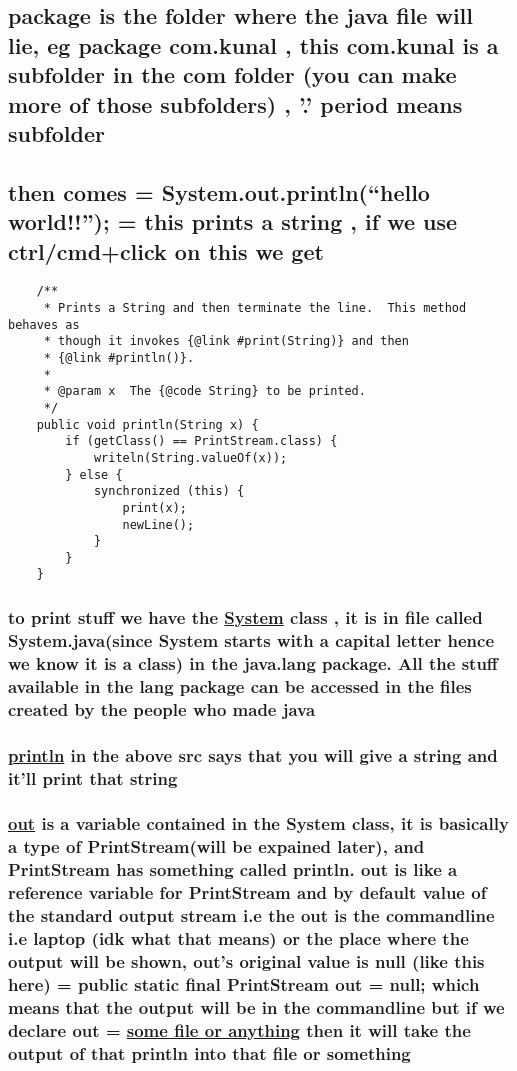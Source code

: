 \documentclass[11pt]{article}
\begin{document}
\subsection{package is the folder where the java file will lie, eg package com.kunal , this com.kunal is a subfolder in the com folder (you can make more of those subfolders) , '.' period means subfolder}
\label{sec:org9e4d127}
\subsection{then comes = System.out.println(``hello world!!''); = this prints a string , if we use ctrl/cmd+click on this we get}
\label{sec:orgc21ebb7}

\begin{verbatim}
    /**
     * Prints a String and then terminate the line.  This method behaves as
     * though it invokes {@link #print(String)} and then
     * {@link #println()}.
     *
     * @param x  The {@code String} to be printed.
     */
    public void println(String x) {
        if (getClass() == PrintStream.class) {
            writeln(String.valueOf(x));
        } else {
            synchronized (this) {
                print(x);
                newLine();
            }
        }
    }
\end{verbatim}

\subsubsection{to print stuff we have the \underline{System} class , it is in file called System.java(since System starts with a capital letter hence we know it is a class) in the java.lang package. All the stuff available in the lang package can be accessed in the files created by the people who made java}
\label{sec:org695fc21}
\subsubsection{\underline{println} in the above src says that you will give a string and it'll print that string}
\label{sec:orgdec896d}
\subsubsection{\underline{out} is a variable contained in the System class, it is basically a type of PrintStream(will be expained later), and PrintStream has something called println. out is like a reference variable for PrintStream and by default value of the standard output stream i.e the out is the commandline i.e laptop (idk what that means) or the place where the output will be shown, out's original value is null (like this here) = public static final PrintStream out = null; which means that the output will be in the commandline but if we declare out = \underline{some file or anything} then it will take the output of that println into that file or something}
\label{sec:org84dba15}
\end{document}
